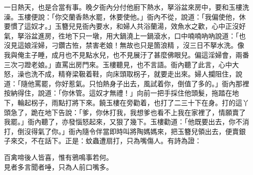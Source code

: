 一日熱天，也是合當有事。晚夕衙內分付他廚下熱水，拏浴盆來房中，要和玉樓洗澡。玉樓便說：「你交蘭香熱水罷，休要使他。」衙內不從，說道：「我偏使他，休要慣了這奴才。」玉簪兒見衙內要水，和婦人共浴蘭湯，效魚水之歡，心中正沒好氣，拏浴盆進房，徃地下只一墩，用大鍋澆上一鍋滾水，口中喃喃吶吶說道：{}「也沒見這娘淫婦，刁鑽古恠，禁害老娘！無故也只是箇浪精𣭈，沒三日不拏水洗。像我與俺主子睡，成月也不見點水兒，也不見展汙了甚麼佛眼兒。偏這淫婦會，兩番三次刁蹬老娘。」直罵出房門來。玉樓聽見，也不言語。衙內聽了此言，心中大怒，澡也洗不成，精脊梁靸着鞋，向床頭取柺子，就要走出來。婦人攔阻住，說道：「隨他罵罷，你好惹氣。只怕熱身子出去，風試着你，倒值了多的。」衙內那裡按納得住，說道：「你休管。這奴才無禮！」向前一把手採住他頭髮，拖踏在地下，輪起柺子，雨點打將下來。饒玉樓在旁勸着，也打了二三十下在身。打的這丫頭急了，跪在地下告說：「爹，你休打我，我想爹也看不上我在家裡了，情願賣了我罷。」衙內聽了，亦發惱怒起來，又狠了幾下。玉樓勸道：「他既要出去，你不消打，倒沒得氣了你。」衙內隨令伴當即時叫將陶媽媽來，把玉簪兒領出去，便賣銀子來交，不在話下。正是：蚊蟲遭扇打，只為嘴傷人。有詩為證：

\begin{myquote}
百禽啼後人皆喜，惟有鴉鳴事若何。\\見者多言聞者唾，只為人前口嘴多。
\end{myquote}

